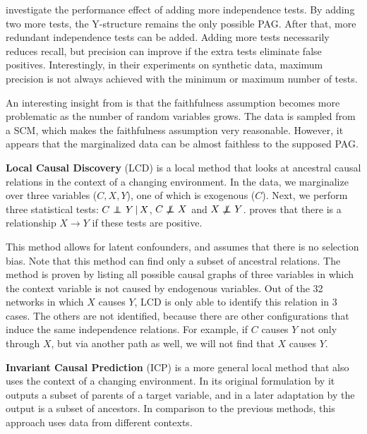 \citet{mooij2015empirical} investigate the performance effect of adding more independence tests. By adding two more tests, the Y-structure remains the only possible PAG. After that, more redundant independence tests can be added. Adding more tests necessarily reduces recall, but precision can improve if the extra tests eliminate false positives. Interestingly, in their experiments on synthetic data, maximum precision is not always achieved with the minimum or maximum number of tests.

An interesting insight from \citet{mooij2015empirical} is that the faithfulness assumption becomes more problematic as the number of random variables grows. The data is sampled from a SCM, which makes the faithfulness assumption very reasonable. However, it appears that the marginalized data can be almost faithless to the supposed PAG. 

\textbf{Local Causal Discovery} (LCD) is a local method that looks at ancestral causal relations in the context of a changing environment. In the data, we marginalize over three variables ($C, X, Y$), one of which is exogenous ($C$). Next, we perform three statistical tests: ${C} \operatorname*{{\,\perp\mkern-12mu\perp\,}}_{} {Y} \,|\, {X}$, $C \operatorname*{{\,\not\mkern-1mu\perp\mkern-12mu\perp\,}} X$ and $X \operatorname*{{\,\not\mkern-1mu\perp\mkern-12mu\perp\,}} Y$. \citet{cooper1997simple} proves that there is a relationship $X \to Y$ if these tests are positive.

This method allows for latent confounders, and assumes that there is no selection bias. Note that this method can find only a subset of ancestral relations. The method is proven by listing all possible causal graphs of three variables in which the context variable is not caused by endogenous variables. Out of the 32 networks in which $X$ causes $Y$, LCD is only able to identify this relation in 3 cases. The others are not identified, because there are other configurations that induce the same independence relations. For example, if $C$ causes $Y$ not only through $X$, but via another path as well, we will not find that $X$ causes $Y$.  


\textbf{Invariant Causal Prediction} (ICP) is a more general local method that also uses the context of a changing environment. In its original formulation by \citet{peters2016causal} it outputs a subset of parents of a target variable, and in a later adaptation by \citet{mooij2016joint} the output is a subset of ancestors. In comparison to the previous methods, this approach uses data from different contexts.

